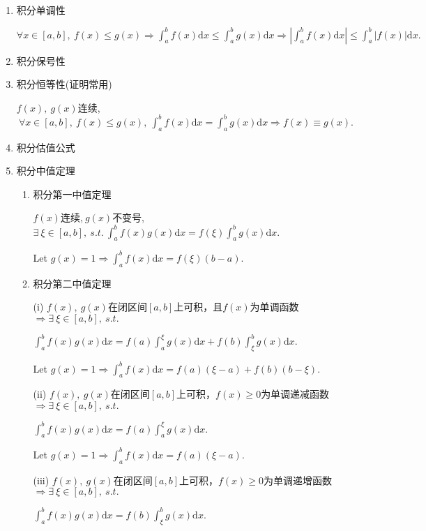 \documentclass[UTF8]{ctexart}
\newcommand\dif{\mathrm{d}}
\newcommand\dis{\displaystyle}
\newcommand\ls{\leqslant}
\newcommand\gs{\geqslant}
\newcommand\intd{\dis\int}
\newcommand\intab{\dis\int_a^b}
\begin{document}
\begin{spacing}{2}
\begin{enumerate}[itemindent=1.4em, label=(\arabic*)]

\item 积分单调性

$\forall x\in[a,b],\ f(x)\ls g(x)\Longrightarrow\intab f(x)\dif x\ls\intab g(x)\dif x\Longrightarrow\left|\intab f(x)\dif x\right|\ls\intab|f(x)|\dif x.$

\item 积分保号性

\item 积分恒等性(证明常用)

$f(x),\ g(x)$连续,$\ \forall x\in[a,b],\ f(x)\ls g(x),\ \intab f(x)\dif x=\intab g(x)\dif  x
\Longrightarrow f(x)\equiv g(x).$

\item 积分估值公式

\item 积分中值定理

\begin{enumerate}[itemindent=1.4em, label=(\alph*)]

\item 积分第一中值定理

$f(x)$连续,$\ g(x)$不变号, $\exists\ \xi\in[a,b],\ s.t.\ \intab f(x)g(x)\dif x
=f(\xi)\intab g(x)\dif x.$

Let $g(x)=1\Longrightarrow \intab f(x)\dif x=f(\xi)(b-a).$

\item \textcolor[rgb]{1,0,0}{积分第二中值定理}

(i) $f(x),\ g(x)$在闭区间$[a,b]$上可积，且$f(x)$为单调函数
$\Longrightarrow\exists\ \xi\in[a,b],\ s.t.\ $

\centerline{$\intab f(x)g(x)\dif x=f(a)\intd_a^\xi g(x)\dif x+f(b)\intd_\xi^bg(x)\dif x.$}

Let $g(x)=1\Longrightarrow\intab f(x)\dif x=f(a)(\xi-a)+f(b)(b-\xi).$

(ii) $f(x),\ g(x)$在闭区间$[a,b]$上可积，$f(x)\gs0$为单调递减函数
$\Longrightarrow\exists\ \xi\in[a,b],\ s.t.\ $

\centerline{$\intab f(x)g(x)\dif x=f(a)\intd_a^\xi g(x)\dif x.$}

Let $g(x)=1\Longrightarrow\intab f(x)\dif x=f(a)(\xi-a).$

(iii) $f(x),\ g(x)$在闭区间$[a,b]$上可积，$f(x)\gs0$为单调递增函数
$\Longrightarrow\exists\ \xi\in[a,b],\ s.t.\ $

\centerline{$\intab f(x)g(x)\dif x=f(b)\intd_\xi^bg(x)\dif x.$}


\end{enumerate}
\end{enumerate}
\end{spacing}
\end{document}

